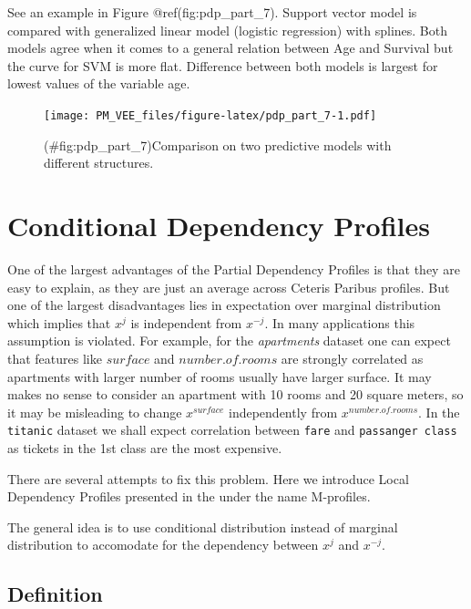 \documentclass[12pt,]{krantz}
\begin{document}
See an example in Figure @ref(fig:pdp\_part\_7). Support vector model is compared with generalized linear model (logistic regression) with splines. Both models agree when it comes to a general relation between Age and Survival but the curve for SVM is more flat. Difference between both models is largest for lowest values of the variable age.

\begin{figure}
\centering
\texttt{[image: PM\_VEE\_files/figure-latex/pdp\_part\_7-1.pdf]}
\caption{(\#fig:pdp\_part\_7)Comparison on two predictive models with different structures.}
\end{figure}

\hypertarget{conditionalProfiles}{%
\section{Conditional Dependency Profiles}\label{conditionalProfiles}}

One of the largest advantages of the Partial Dependency Profiles is that they are easy to explain, as they are just an average across Ceteris Paribus profiles. But one of the largest disadvantages lies in expectation over marginal distribution which implies that \(x^j\) is independent from \(x^{-j}\). In many applications this assumption is violated. For example, for the \emph{apartments} dataset one can expect that features like \(surface\) and \(number.of.rooms\) are strongly correlated as apartments with larger number of rooms usually have larger surface. It may makes no sense to consider an apartment with 10 rooms and 20 square meters, so it may be misleading to change \(x^{surface}\) independently from \(x^{number.of.rooms}\). In the \texttt{titanic} dataset we shall expect correlation between \texttt{fare} and \texttt{passanger\ class} as tickets in the 1st class are the most expensive.

There are several attempts to fix this problem. Here we introduce Local Dependency Profiles presented in the \citep{R-ALEPlot} under the name M-profiles.

The general idea is to use conditional distribution instead of marginal distribution to accomodate for the dependency between \(x^j\) and \(x^{-j}\).

\hypertarget{definition-1}{%
\subsection{Definition}\label{definition-1}}
\end{document}
